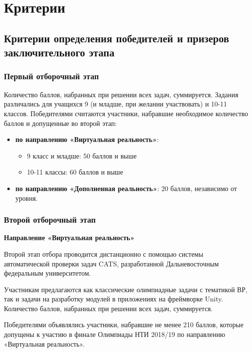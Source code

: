 \part{Критерии}
\chapter{Критерии определения победителей и призеров заключительного этапа}

\section{Первый отборочный этап}
 
Количество баллов, набранных при решении всех задач, суммируется. Задания различались для учащихся 9 (и младше, при желании участвовать) и 10-11 классов. Победителями считаются участники, набравшие необходимое количество баллов и допущенные во второй этап: 
\begin{itemize}
    \item \textbf{по направлению «Виртуальная реальность»}: 
    \begin{itemize}
        \item 9 класс и младше: 50 баллов и выше
        \item 10-11 классы: 60 баллов и выше 
    \end{itemize}
    \item \textbf{по направлению «Дополненная реальность»}: 20 баллов, независимо от уровня.
\end{itemize}

\section{Второй отборочный этап}

\textbf{Направление «Виртуальная реальность»}

Второй этап отбора проводится дистанционно с помощью системы автоматической проверки задач CATS, разработанной Дальневосточным федеральным университетом.

Участникам предлагаются как классические олимпиадные задачи с тематикой ВР, так и задачи на разработку модулей в приложениях на фреймворке Unity. Количество баллов, набранных при решении всех задач, суммируется.

Победителями объявлялись участники, набравшие не менее 210 баллов, которые допущены к участию в финале Олимпиады НТИ 2018/19 по направлению «Виртуальная реальность».


